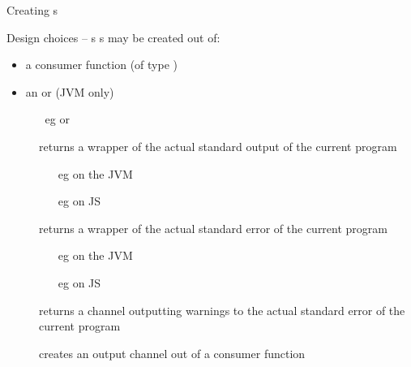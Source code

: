 \documentclass[handout]{beamer}
\begin{document}
\begin{frame}[allowframebreaks]{Creating s}
    \begin{block}{Design choices -- s}
        s may be created out of:
        \begin{itemize}
            \item a \alert{consumer} function (of type \alert{})
            \item an  or  (JVM only)
            \begin{itemize}
                \item[eg]  or 
            \end{itemize}
        \end{itemize}
    \end{block}
    \begin{description}
        \item[] returns a wrapper of the actual standard output of the current program
        \begin{itemize}\small
            \item[eg]  on the JVM
            \item[eg]  on JS
        \end{itemize}
        \item[] returns a wrapper of the actual standard error of the current program
        \begin{itemize}\small
            \item[eg]  on the JVM
            \item[eg]  on JS
        \end{itemize}
        \item[] returns a channel outputting warnings to the actual standard error of the current program
        \item[] creates an output channel out of a consumer function
    \end{description}

\end{frame}
\end{document}
